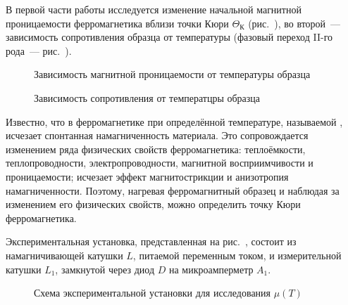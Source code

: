 






В первой части работы исследуется изменение начальной магнитной проницаемости
ферромагнетика вблизи точки Кюри $\Theta_{К}$ (рис.~), во второй~--- зависимость сопротивления образца
от температуры (фазовый переход II-го рода~--- рис.~).

\begin{figure}[h!]
    \hfil
\parbox{5cm}{%
	\begin{minipage}[b]{5cm}
		\caption{Зависимость магнитной проницаемости от температуры образца}
	\end{minipage}%
}
	\hfil
\parbox{5cm}{%
	\begin{minipage}[b]{5cm}
		\caption{Зависимость сопротивления от температцры образца}
	\end{minipage}%
}
\end{figure}


Известно, что в ферромагнетике при определённой температуре, называемой
, исчезает спонтанная намагниченность материала. Это
сопровождается изменением ряда физических свойств ферромагнетика: теплоёмкости,
теплопроводности, электропроводности, магнитной восприимчивости и
проницаемости; исчезает эффект магнитострикции и анизотропия намагниченности.
Поэтому, нагревая ферромагнитный образец и наблюдая за изменением его физических
свойств, можно определить точку Кюри ферромагнетика.


\experiment
Экспериментальная установка, представленная на рис.~, состоит из намагничивающей катушки $L$,
питаемой переменным током, и измерительной катушки $L_1$, замкнутой через диод
$D$ на микроамперметр $A_1$.

\begin{figure}[h!]
	\caption{Схема экспериментальной установки для исследования $\mu(T)$}
\end{figure}


